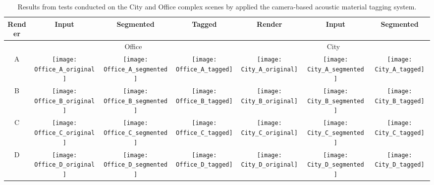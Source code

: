 \begin{landscape}
\begin{table}[]
\def\cogimsw{0.199\textwidth}
\centering
\caption{Results from tests conducted on the City and Office complex scenes by applied the camera-based acoustic material tagging system.}
\begin{tabular}{ccccccc}
\toprule
Render & Input & Segmented & Tagged & Render & Input & Segmented \\ \midrule
\multicolumn{1}{c}{}  & \multicolumn{3}{c}{Office} & \multicolumn{3}{c}{City} \\
\multicolumn{1}{c}{A} & \texttt{[image: Office\_A\_original]} & \texttt{[image: Office\_A\_segmented]} & \texttt{[image: Office\_A\_tagged]} & \texttt{[image: City\_A\_original]} & \texttt{[image: City\_A\_segmented]} & \texttt{[image: City\_A\_tagged]} \\
\multicolumn{1}{c}{B} & \texttt{[image: Office\_B\_original]} & \texttt{[image: Office\_B\_segmented]} & \texttt{[image: Office\_B\_tagged]} & \texttt{[image: City\_B\_original]} & \texttt{[image: City\_B\_segmented]} & \texttt{[image: City\_B\_tagged]} \\
\multicolumn{1}{c}{C} & \texttt{[image: Office\_C\_original]} & \texttt{[image: Office\_C\_segmented]} & \texttt{[image: Office\_C\_tagged]} & \texttt{[image: City\_C\_original]} & \texttt{[image: City\_C\_segmented]} & \texttt{[image: City\_C\_tagged]} \\
\multicolumn{1}{c}{D} & \texttt{[image: Office\_D\_original]} & \texttt{[image: Office\_D\_segmented]} & \texttt{[image: Office\_D\_tagged]} & \texttt{[image: City\_D\_original]} & \texttt{[image: City\_D\_segmented]} & \texttt{[image: City\_D\_tagged]} \\
\end{tabular}
\label{tab:cog-preliminary-results}
\end{table}
\end{landscape}